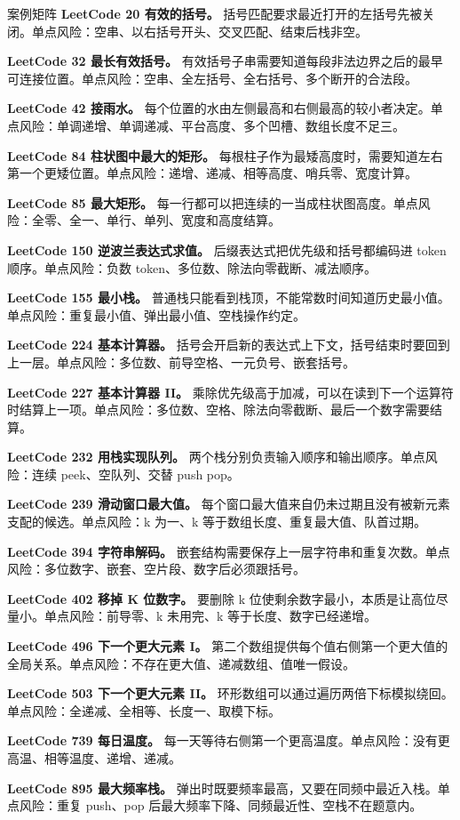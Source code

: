 \begin{principlebox}{案例矩阵}
\textbf{LeetCode 20 有效的括号。}
括号匹配要求最近打开的左括号先被关闭。单点风险：空串、以右括号开头、交叉匹配、结束后栈非空。

\textbf{LeetCode 32 最长有效括号。}
有效括号子串需要知道每段非法边界之后的最早可连接位置。单点风险：空串、全左括号、全右括号、多个断开的合法段。

\textbf{LeetCode 42 接雨水。}
每个位置的水由左侧最高和右侧最高的较小者决定。单点风险：单调递增、单调递减、平台高度、多个凹槽、数组长度不足三。

\textbf{LeetCode 84 柱状图中最大的矩形。}
每根柱子作为最矮高度时，需要知道左右第一个更矮位置。单点风险：递增、递减、相等高度、哨兵零、宽度计算。

\textbf{LeetCode 85 最大矩形。}
每一行都可以把连续的一当成柱状图高度。单点风险：全零、全一、单行、单列、宽度和高度结算。

\textbf{LeetCode 150 逆波兰表达式求值。}
后缀表达式把优先级和括号都编码进 token 顺序。单点风险：负数 token、多位数、除法向零截断、减法顺序。

\textbf{LeetCode 155 最小栈。}
普通栈只能看到栈顶，不能常数时间知道历史最小值。单点风险：重复最小值、弹出最小值、空栈操作约定。

\textbf{LeetCode 224 基本计算器。}
括号会开启新的表达式上下文，括号结束时要回到上一层。单点风险：多位数、前导空格、一元负号、嵌套括号。

\textbf{LeetCode 227 基本计算器 II。}
乘除优先级高于加减，可以在读到下一个运算符时结算上一项。单点风险：多位数、空格、除法向零截断、最后一个数字需要结算。

\textbf{LeetCode 232 用栈实现队列。}
两个栈分别负责输入顺序和输出顺序。单点风险：连续 peek、空队列、交替 push pop。

\textbf{LeetCode 239 滑动窗口最大值。}
每个窗口最大值来自仍未过期且没有被新元素支配的候选。单点风险：k 为一、k 等于数组长度、重复最大值、队首过期。

\textbf{LeetCode 394 字符串解码。}
嵌套结构需要保存上一层字符串和重复次数。单点风险：多位数字、嵌套、空片段、数字后必须跟括号。

\textbf{LeetCode 402 移掉 K 位数字。}
要删除 k 位使剩余数字最小，本质是让高位尽量小。单点风险：前导零、k 未用完、k 等于长度、数字已经递增。

\textbf{LeetCode 496 下一个更大元素 I。}
第二个数组提供每个值右侧第一个更大值的全局关系。单点风险：不存在更大值、递减数组、值唯一假设。

\textbf{LeetCode 503 下一个更大元素 II。}
环形数组可以通过遍历两倍下标模拟绕回。单点风险：全递减、全相等、长度一、取模下标。

\textbf{LeetCode 739 每日温度。}
每一天等待右侧第一个更高温度。单点风险：没有更高温、相等温度、递增、递减。

\textbf{LeetCode 895 最大频率栈。}
弹出时既要频率最高，又要在同频中最近入栈。单点风险：重复 push、pop 后最大频率下降、同频最近性、空栈不在题意内。

\end{principlebox}


